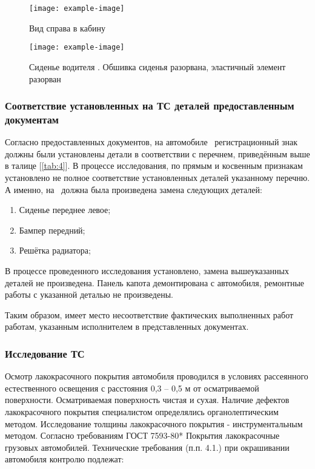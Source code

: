 {   
   
   
   
   
   \begin{figure}[H]\centering
   	\parbox[t]{0.49\textwidth}
   	{\centering
   		\texttt{[image: example-image]}
   		\caption{\footnotesize {Вид справа в кабину }}
   		\label{кабинасправа}}
   	\hfil \hfil
   	\parbox[t]{0.49\textwidth}
   	{\centering
   		\texttt{[image: example-image]}
   		\caption{\footnotesize {Сиденье водителя \tc. Обшивка сиденья разорвана, эластичный элемент разорван}}
   		\label{сиденьеводителя}}
   \end{figure}
   
   
   
   
   
   
\subsubsection{Соответствие установленных на ТС деталей предоставленным документам}

Согласно предоставленных документов, на автомобиле \, регистрационный знак \, должны были установлены детали в соответствии с перечнем, приведённым выше  в талице [\ref{tab:4}]. В процессе исследования, по прямым и косвенным признакам установлено не полное соответствие установленных деталей указанному перечню. А именно, на \,  должна была произведена замена следующих деталей:
\begin{enumerate}
	\item Сиденье переднее левое;
	\item Бампер передний;
	\item Решётка радиатора;
\end{enumerate}
  В процессе проведенного исследования установлено,   замена вышеуказанных деталей не произведена. Панель капота демонтирована с автомобиля,  ремонтные работы с указанной деталью не произведены. 
   
   Таким образом,   имеет место несоответствие фактических выполненных работ работам, указанным исполнителем в представленных документах.
     
      
   \subsubsection{Исследование  ТС  }
   
   \indent Осмотр лакокрасочного покрытия автомобиля проводился в условиях рассеянного естественного освещения с расстояния  0,3 -- 0,5 м от осматриваемой поверхности. Осматриваемая поверхность чистая  и сухая.
   Наличие дефектов лакокрасочного покрытия специалистом определялись органолептическим методом. Исследование толщины лакокрасочного покрытия - инструментальным методом. 
   Согласно требованиям ГОСТ 7593-80* Покрытия лакокрасочные грузовых автомобилей. Технические требования (п.п. 4.1.)  при окрашивании автомобиля контролю подлежат:\\
   
}

